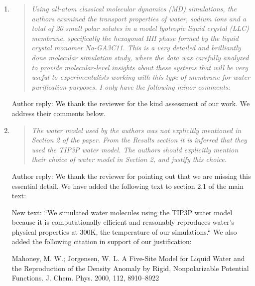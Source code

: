 \documentclass{article}
\begin{document}
\begin{enumerate}
	
	\item \begin{quote} \textit{Using all-atom classical molecular dynamics (MD) simulations,
	the authors examined the transport properties of water, sodium ions and a total of 20 
	small polar solutes in a model lyotropic liquid crystal (LLC) membrane, specifically the
	hexagonal HII phase formed by the liquid crystal monomer Na-GA3C11. This is a very 
	detailed and brilliantly done molecular simulation study, where the data was carefully 
	analyzed to provide molecular-level insights about these systems that will be very 
	useful to experimentalists working with this type of membrane for water purification 
	purposes. I only have the following minor comments: }\end{quote}
	
	Author reply: We thank the reviewer for the kind assessment of our work. We address their
	comments below.
	
	\item \begin{quote}
	
	\textit{The water model used by the authors was not explicitly mentioned in Section 2 
	of the paper. From the Results section it is inferred that they used the TIP3P water model.
	The authors should explicitly mention their choice of water model in Section 2, and 
	justify this choice.}
	
	\end{quote}
	
	Author reply: We thank the reviewer for pointing out that we are missing this essential detail.
	We have added the following text to section 2.1 of the main text:

	New text: ``We simulated water molecules using the TIP3P water model because it is 
    computationally efficient and reasonably reproduces water's physical properties
    at 300K, the temperature of our simulations.``
  	We also added the following citation in support of our justification:
  	
  	Mahoney, M. W.; Jorgensen, W. L. A Five-Site Model for Liquid Water and the Reproduction
  	of the Density Anomaly by Rigid, Nonpolarizable Potential Functions. J. Chem. Phys. 2000, 
  	112, 8910–8922
    

\end{enumerate}
\end{document}
